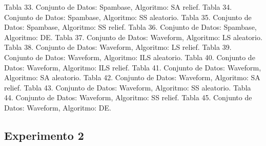 \documentclass{ci5652}
\begin{document}
Tabla 33. Conjunto de Datos: Spambase, Algoritmo: SA relief.
Tabla 34. Conjunto de Datos: Spambase, Algoritmo: SS aleatorio.
Tabla 35. Conjunto de Datos: Spambase, Algoritmo: SS relief.
Tabla 36. Conjunto de Datos: Spambase, Algoritmo: DE.
Tabla 37. Conjunto de Datos: Waveform, Algoritmo: LS aleatorio.
Tabla 38. Conjunto de Datos: Waveform, Algoritmo: LS relief.
Tabla 39. Conjunto de Datos: Waveform, Algoritmo: ILS aleatorio.
Tabla 40. Conjunto de Datos: Waveform, Algoritmo: ILS relief.
Tabla 41. Conjunto de Datos: Waveform, Algoritmo: SA aleatorio.
Tabla 42. Conjunto de Datos: Waveform, Algoritmo: SA relief.
Tabla 43. Conjunto de Datos: Waveform, Algoritmo: SS aleatorio.
Tabla 44. Conjunto de Datos: Waveform, Algoritmo: SS relief.
Tabla 45. Conjunto de Datos: Waveform, Algoritmo: DE.

\subsection*{Experimento 2}
\end{document}

